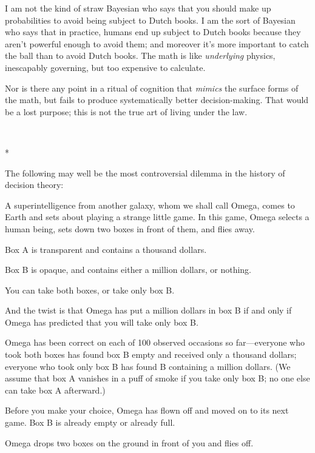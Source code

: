 {
 I am not the kind of straw Bayesian who says that you should make
up probabilities to avoid being subject to Dutch books. I am the sort
of Bayesian who says that in practice, humans end up subject to Dutch
books because they aren't powerful enough to avoid
them; and moreover it's more important to catch the
ball than to avoid Dutch books. The math is like \textit{underlying}
physics, inescapably governing, but too expensive to calculate.}

{
 Nor is there any point in a ritual of cognition that
\textit{mimics} the surface forms of the math, but fails to produce
systematically better decision-making. That would be a lost purpose;
this is not the true art of living under the law.}

{\centering
 \ ~
\par}

{\centering
 *
\par}


{
 The following may well be the most controversial dilemma in the
history of decision theory:}

{
 A superintelligence from another galaxy, whom we shall call Omega,
comes to Earth and sets about playing a strange little game. In this
game, Omega selects a human being, sets down two boxes in front of
them, and flies away.}

{
 Box A is transparent and contains a thousand dollars.}

{
 Box B is opaque, and contains either a million dollars, or
nothing.}

{
 You can take both boxes, or take only box B.}

{
 And the twist is that Omega has put a million dollars in box B if
and only if Omega has predicted that you will take only box B.}

{
 Omega has been correct on each of 100 observed occasions so
far---everyone who took both boxes has found box B empty and received
only a thousand dollars; everyone who took only box B has found B
containing a million dollars. (We assume that box A vanishes in a puff
of smoke if you take only box B; no one else can take box A
afterward.)}

{
 Before you make your choice, Omega has flown off and moved on to
its next game. Box B is already empty or already full.}

{
 Omega drops two boxes on the ground in front of you and flies
off.}

